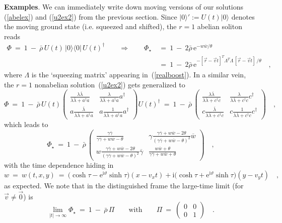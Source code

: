 \documentclass[a4paper,11pt]{article}
\numberwithin{equation}{section}
\def\g{\gamma}
\def\th{\theta}
\def\l{\lambda}
\def\e{\mbox{e}}
\def\i{\mbox{i}}
\newcommand{\adag}{a^{\dagger}}
\newcommand{\cdag}{c^{\dagger}}
\newcommand{\gb}{\overline{\gamma}}
\newcommand{\lb}{\overline{\lambda}}
\newcommand{\wb}{\overline{w}}
\begin{document}
\noindent
{\bf Examples}.
We can immediately write down moving versions of our solutions
(\ref{abelex}) and (\ref{u2ex2}) from the previous section.
Since $|0\rangle':=U(t)|0\rangle$ denotes the moving
ground state (i.e. squeezed and shifted), the $r{=}1$ abelian soliton reads
\begin{align}
\Phi\ =\ 1\ -\ \bar\rho\,U(t)\,|0\rangle\langle0|\,U(t)^\dagger
\qquad\Longrightarrow\qquad
\Phi_\star\ &=\ 1\ -\ 2\bar\rho\,\e^{-w\wb/\th} \nonumber\\
&=\ 1\ -\ 2\bar\rho\,
\e^{-[\vec r-\vec v t]^T \Lambda^T\!\Lambda\,[\vec r-\vec v t]\,/\th}
\quad,
\end{align}
where $\Lambda$ is the `squeezing matrix' appearing in~(\ref{realboost}).
In a similar vein, the $r{=}1$ nonabelian solution~(\ref{u2ex2})
gets generalized to
\begin{equation}
\Phi\ =\ 1\ -\ \bar\rho\,U(t) \left(\begin{matrix}
\frac{\l\lb}{\l\lb+\adag a} & \frac{\l}{\l\lb+\adag a}\adag \\[10pt]
a\frac{\lb}{\l\lb+\adag a} & a\frac{1}{\l\lb+\adag a}\adag
\end{matrix}\right) U(t)^\dagger\ =\
1\ -\ \bar\rho\,\left(\begin{matrix}
\frac{\l\lb}{\l\lb+\cdag c} & \frac{\l}{\l\lb+\cdag c}\cdag \\[10pt]
c\frac{\lb}{\l\lb+\cdag c} & c\frac{1}{\l\lb+\cdag c}\cdag
\end{matrix}\right) \quad,
\end{equation}
which leads to
\begin{equation}
\Phi_\star\ =\ 1\ -\ \bar\rho\,\left(\begin{matrix}
\frac{\g\gb}{\g\gb+w\wb-\th} &
\g\frac{\g\gb+w\wb-2\th}{(\g\gb+w\wb-\th)^2}\wb \\[10pt]
w\frac{\g\gb+w\wb-2\th}{(\g\gb+w\wb-\th)^2}\gb &
\frac{w\wb+\th}{\g\gb+w\wb+\th}
\end{matrix}\right) \quad,
\end{equation}
with the time dependence hiding in
\begin{equation}
w\ =\ w(t,x,y)\ =\
\bigl(\cosh\tau-\e^{\i\vartheta}\sinh\tau\bigr)(x-v_xt) + \i
\bigl(\cosh\tau+\e^{\i\vartheta}\sinh\tau\bigr)(y-v_yt) \quad,
\end{equation}
as expected.
We note that in the distinguished frame the large-time limit
(for $\vec v{\neq}\vec0$) is
\begin{equation}
\lim_{|t|\to\infty} \Phi_\star\ =\ 1\ -\ \bar\rho\,\Pi
\qquad\textrm{with}\qquad
\Pi\ =\ \begin{pmatrix} 0 & 0 \\ 0 & 1 \end{pmatrix} \quad.
\end{equation}
\end{document}

